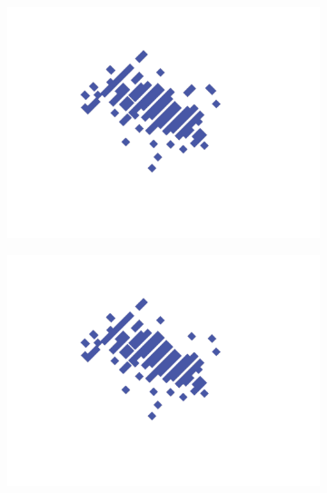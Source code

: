 
\begin{figure}[tbph]
\centering
  \begin{subfigure}[b]{0.3\textwidth}
    \includegraphics[width=\textwidth]{photon/allPhoton2}
    \caption{}
    \label{fig:photonEvtDspPhotonFragAll}
  \end{subfigure}
  \begin{subfigure}[b]{0.3\textwidth}
    \includegraphics[width=\textwidth]{photon/big2}
    \caption{}
    \label{fig:photonEvtDspPhotonFragBig}
  \end{subfigure}
  \begin{subfigure}[b]{0.3\textwidth}

\end{subfigure}
\end{figure}
